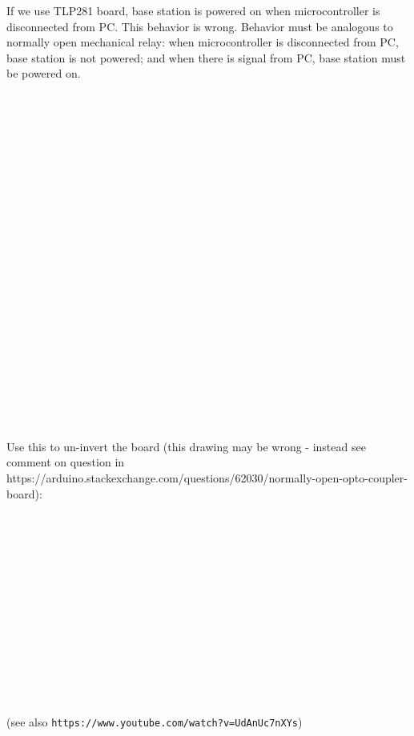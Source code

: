 \nopagenumbers
If we use TLP281 board, base station is powered on when microcontroller is disconnected from PC.
This behavior is wrong. Behavior must be analogous to normally open mechanical relay: when
microcontroller is disconnected from PC, base station is not powered; and when
there is signal from PC, base station must be powered on.
$$\hbox to16cm{\vbox to5.82cm{\vfil\special{psfile=tlp2.eps
  clip llx=0 lly=0 urx=863 ury=314 rwi=4535}}\hfil}$$
$$\hbox to15.38cm{\vbox to7.26722222222222cm{\vfil\special{psfile=tlp1.eps
  clip llx=0 lly=0 urx=436 ury=206 rwi=4360}}\hfil}$$
Use this to un-invert the board (this drawing may be wrong - instead see comment on question in https://arduino.stackexchange.com/questions/62030/normally-open-opto-coupler-board):
$$\hbox to7.26cm{\vbox to6.24416666666667cm{\vfil\special{psfile=TLP281.1
  clip llx=-91 lly=-43 urx=115 ury=134 rwi=2060}}\hfil}$$
\vfil
(see also {\tt https://www.youtube.com/watch?v=UdAnUc7nXYs})
\bye
